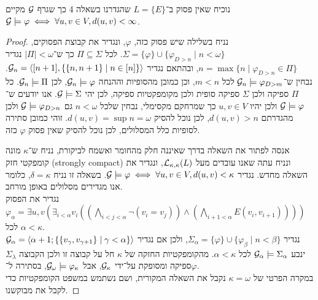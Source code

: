 \question{}
נוכיח שאין פסוק ב־$L = \{ E \}$ שהגדרנו בשאלה 4 כך שגרף $\mathcal{G}$ מקיים $\mathcal{G} \models \varphi \iff \forall u, v \in V, d(u, v) < \infty$.
\begin{proof}
	נניח בשלילה שיש פסוק כזה, $\varphi$, ונגדיר את קבוצת הפסוקים, $\Sigma = \{ \varphi \} \cup \{ \varphi_{D > n} \mid n < \omega \}$.
	לכל $\Pi \subseteq \Sigma$ כך ש־$|\Pi| < \omega$ נגדיר $n = \max\{ n \mid \varphi_{D > n} \in \Pi \}$, ובהתאם נגדיר $\mathcal{G}_n = \langle [n + 1], \{ \{n, n + 1\} \mid n \in [n] \}\rangle$.
	נבחין ש־$\mathcal{G}_n \models \varphi_{D > m}$ לכל $m < n$, וכן כמובן מהסופיות וההנחה $\mathcal{G}_n \models \varphi$, לכן $\mathcal{G}_n \models \Pi$.
	כל $\Pi$ ספיקה ולכן $\Sigma$ ספיקה סופית ולכן מקומפקטיות ספיקה, לכן יהי $\mathcal{G} \models \Sigma$.
	אנו יודעים ש־$\mathcal{G} \models \varphi$ ולכן יהיו $u, v \in V$ כך שמרחקם מקסימלי, נבחין שלכל $n < \omega$ גם $\mathcal{G} \models \varphi_{D > n}$ ולכן מהגדרתם $d(u, v) > n$, לכן נוכל להסיק $d(u, v) = \sup n = \omega$.
	זוהי כמובן סתירה לסופיות כלל המסלולים, לכן נוכל להסיק שאין פסוק $\varphi$ כזה.

	אנסה לפתור את השאלה בדרך שאיננה חלק מהחומר ואשמח לביקורת,
	נניח ש־$\kappa$ מונה קומפקטי חזק (strongly compact) ונניח עתה שאנו עובדים מעל $\mathcal{L}_{\kappa, \kappa}(L)$, ונגדיר את השאלה מחדש.
	נגדיר $\mathcal{G} \models \varphi \iff \forall u, v \in V, d(u, v) < \kappa$.
	בשאלה זו נניח $\delta = \kappa$, כלומר אנו מגדירים מסלולים באופן מורחב. \\
	נגדיר את הפסוק $\varphi_\alpha = \exists u, v (\exists_{i < \alpha} v_i ((\bigwedge_{i < j < \alpha} \lnot (v_i = v_j)) \land (\bigwedge_{i + 1 < \alpha} E(v_i, v_{i + 1}))))$ לכל $\alpha < \kappa$. \\
	נגדיר $\Sigma_\alpha = \{ \varphi \} \cup \{ \varphi_\beta \mid n < \beta \}$,
	ולכן אם נגדיר $\mathcal{G}_\alpha = \langle \alpha + 1; \{ \{ v_\gamma, v_{\gamma + 1} \} \mid \gamma < \alpha \} \rangle$ ינבע $\mathcal{G}_\alpha \models \Sigma_\alpha$ לכל $\alpha < \kappa$.
	מהקומפקטיות החזקה של $\kappa$ חל על קבוצה זו ולכן הקבוצה $\Sigma_\lambda$ ספיקה ומסופקת על־ידי $\mathcal{G}_\kappa$, אבל $\mathcal{G}_\omega \models \varphi_\kappa$, בסתירה ל־$\varphi$. \\
	במקרה הפרטי של $\kappa = \omega$ נקבל את השאלה המקורית, ושם נשתמש במשפט הקומפקטיות כדי לקבל את מבוקשנו.
\end{proof}


